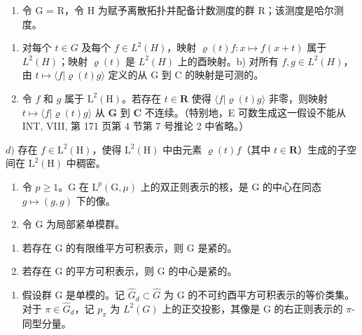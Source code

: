 \begin{enumerate}
\def\labelenumi{\arabic{enumi})}
\setcounter{enumi}{2}
\tightlist
\item
  令 G = R，令 H 为赋予离散拓扑并配备计数测度的群 R；该测度是哈尔测度。
\end{enumerate}

\begin{enumerate}
\def\labelenumi{\alph{enumi})}
\item
  对每个 \(t \in G\) 及每个 \(f \in L^{2}(H)\)，映射 \(\varrho(t)f: x \mapsto f(x + t)\) 属于 \(L^{2}(H)\)；映射 \(\varrho(t)\) 是 \(L^{2}(H)\) 上的酉映射。b) 对所有 \(f,g \in L^{2}(H)\)，由 \(t \mapsto \langle f | \varrho(t)g \rangle\) 定义的从 G 到 C 的映射是可测的。
\item
  令 \(f\) 和 \(g\) 属于 \(\mathrm{L}^2(\mathrm{H})\)。若存在 \(t \in \mathbf{R}\) 使得 \(\langle f | \varrho(t)g \rangle\) 非零，则映射 \(t \mapsto \langle f | \varrho(t)g \rangle\) 从 \(\mathbf{G}\) 到 \(\mathbf{C}\) 不连续。（特别地，E 可数生成这一假设不能从 INT, VIII, 第 171 页第 4 节第 7 号推论 2 中省略。）
\end{enumerate}

\(d)\) 存在 \(f \in \mathrm{L}^2(\mathrm{H})\)，使得 \(\mathrm{L}^2(\mathrm{H})\) 中由元素 \(\varrho(t)f\)（其中 \(t \in \mathbf{R}\)）生成的子空间在 \(\mathrm{L}^2(\mathrm{H})\) 中稠密。

\begin{enumerate}
\def\labelenumi{\arabic{enumi})}
\setcounter{enumi}{3}
\item
  令 \(p \geqslant 1\)。G 在 \(\mathrm{L}^{p}(\mathrm{G}, \mu)\) 上的双正则表示的核，是 G 的中心在同态 \(g \mapsto (g, g)\) 下的像。
\item
  令 G 为局部紧单模群。
\end{enumerate}

\begin{enumerate}
\def\labelenumi{\alph{enumi})}
\item
  若存在 G 的有限维平方可积表示，则 G 是紧的。
\item
  若存在 G 的平方可积表示，则 G 的中心是紧的。
\end{enumerate}

\begin{enumerate}
\def\labelenumi{\arabic{enumi})}
\setcounter{enumi}{5}
\tightlist
\item
  假设群 G 是单模的。记 \(\widehat{G}_{d} \subset \widehat{G}\) 为 G 的不可约酉平方可积表示的等价类集。对于 \(\pi \in \widehat{G}_{d}\)，记 \(p_{\pi}\) 为 \(L^{2}(G)\) 上的正交投影，其像是 G 的右正则表示的 \(\pi\)-同型分量。
\end{enumerate}

